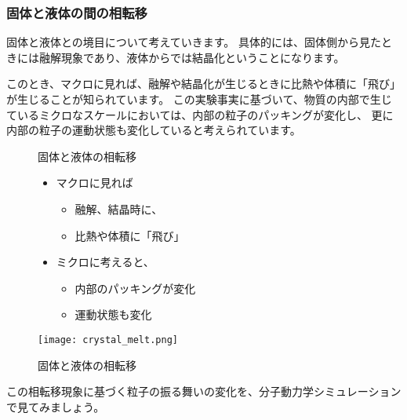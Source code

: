 \documentclass[uplatex,dvipdfmx,a4paper,11pt]{jsarticle}
\begin{document}
\subsubsection{固体と液体の間の相転移}

固体と液体との境目について考えていきます。
具体的には、固体側から見たときには融解現象であり、液体からでは結晶化ということになります。

このとき、マクロに見れば、融解や結晶化が生じるときに比熱や体積に「飛び」が生じることが知られています。
この実験事実に基づいて、物質の内部で生じているミクロなスケールにおいては、内部の粒子のパッキングが変化し、
更に内部の粒子の運動状態も変化していると考えられています。
\begin{figure}[htb]
	\begin{center}
		\begin{minipage}{0.43\textwidth}
			\large
			\begin{itembox}[l]{固体と液体の相転移}
				\begin{itemize}
					\item マクロに見れば
					\begin{itemize}
						\item 融解、結晶時に、
						\item 比熱や体積に「飛び」
					\end{itemize}
					\item ミクロに考えると、
					\begin{itemize}
						\item 内部のパッキングが変化
						\item 運動状態も変化
					\end{itemize}
				\end{itemize}
			\end{itembox}
		\end{minipage}
		\begin{minipage}{0.47\textwidth}
			\begin{center}
			\texttt{[image: crystal\_melt.png]}
			\end{center}
		\end{minipage}
		\caption{固体と液体の相転移}
		\label{fig:crystal_melt}
	\end{center}
\end{figure}

この相転移現象に基づく粒子の振る舞いの変化を、分子動力学シミュレーションで見てみましょう。
\end{document}
